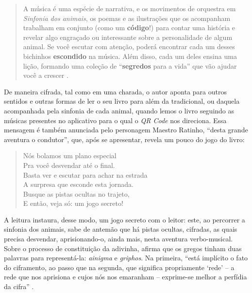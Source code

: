 \documentclass[portuguese]{textolivre}
\begin{document}
\begin{quote}
A música é uma espécie de narrativa, e os movimentos de orquestra em
\textit{Sinfonia dos animais}, os poemas e as ilustrações que os acompanham
trabalham em conjunto (como um \textbf{código}!) para contar uma história e
revelar algo engraçado ou interessante sobre a personalidade de algum animal.
Se você escutar com atenção, poderá encontrar cada um desses bichinhos
\textbf{escondido} na música. Além disso, cada um deles ensina uma lição,
formando uma coleção de “\textbf{segredos} para a vida” que vão ajudar você a
crescer \cite[s/p, grifos nossos]{brown_sinfonia_2020}.
\end{quote}

De maneira cifrada, tal como em uma charada, o autor aponta para outros
sentidos e outras formas de ler o seu livro para além da tradicional, ou
daquela acompanhada pela sinfonia de cada animal, quando lemos o livro seguindo
as músicas presentes no aplicativo para o qual o \textit{QR Code} nos
direciona. Essa mensagem é também anunciada pelo personagem Maestro Ratinho,
“desta grande aventura o condutor”, que, após se apresentar, revela um pouco do
jogo do livro:

\begin{quote}
Nós bolamos um plano especial\\
Pra você desvendar até o final.\\

Basta ver e escutar para achar na estrada\\
A surpresa que esconde esta jornada.\\

Busque as pistas ocultas no trajeto,\\
E então, veja só: um jogo secreto!\\
\cite[s/p]{brown_sinfonia_2020}
\end{quote}

A leitura instaura, desse modo, um jogo secreto com o leitor: este, ao
percorrer a sinfonia dos animais, sabe de antemão que há pistas ocultas,
cifradas, as quais precisa desvendar, aprisionando-o, ainda mais, nesta
aventura verbo-musical. Sobre o processo de constituição da adivinha,
\textcite{jolles_formas_1976} afirma que os gregos tinham duas palavras para
representá-la: \textit{ainigma} e \textit{griphos}. Na primeira, “está
implícito o fato do ciframento, ao passo que na segunda, que significa
propriamente ‘rede’ – a rede que nos aprisiona e cujos nós nos emaranham –
exprime-se melhor a perfídia da cifra” \cite[p.~123]{jolles_formas_1976}.
\end{document}

